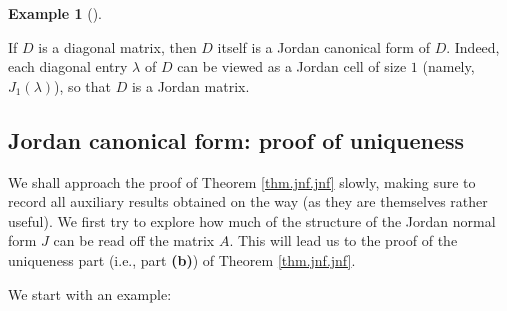 \documentclass[numbers=enddot,12pt,final,onecolumn,notitlepage]{scrartcl}%
\numberwithin{exer}{subsection}
\theoremstyle{definition}
\newtheorem{exam}[theo]{Example}
\newenvironment{example}[1][]
{\begin{exam}[#1]\begin{leftbar}}
{\end{leftbar}\end{exam}}
\begin{document}
\begin{example}
If $D$ is a diagonal matrix, then $D$ itself is a Jordan canonical form of
$D$. Indeed, each diagonal entry $\lambda$ of $D$ can be viewed as a Jordan
cell of size $1$ (namely, $J_{1}\left(  \lambda\right)  $), so that $D$ is a
Jordan matrix.
\end{example}

\subsection{Jordan canonical form: proof of uniqueness}

We shall approach the proof of Theorem \ref{thm.jnf.jnf} slowly, making sure
to record all auxiliary results obtained on the way (as they are themselves
rather useful). We first try to explore how much of the structure of the
Jordan normal form $J$ can be read off the matrix $A$. This will lead us to
the proof of the uniqueness part (i.e., part \textbf{(b)}) of Theorem
\ref{thm.jnf.jnf}.

We start with an example:
\end{document}
